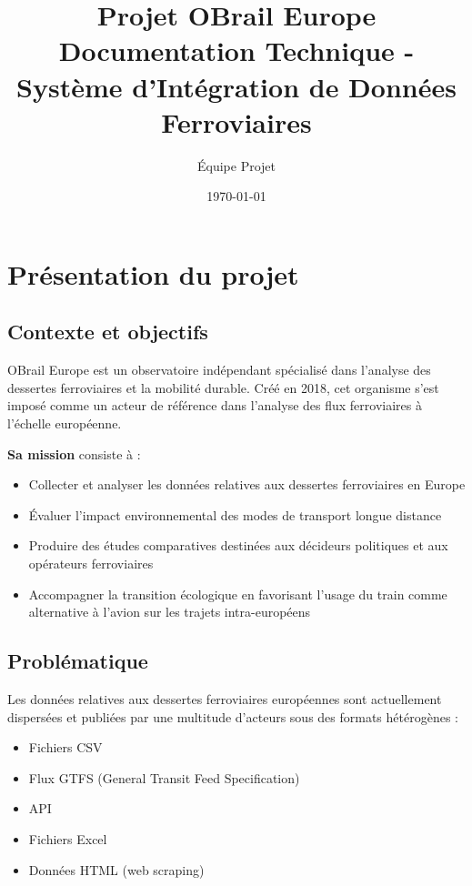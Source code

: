 \documentclass[12pt,a4paper]{article}
\title{\textbf{Projet OBrail Europe} \\
\large Documentation Technique - Système d'Intégration de Données Ferroviaires}
\author{Équipe Projet}
\date{\today}
\begin{document}
\maketitle
\tableofcontents
\newpage

\section{Présentation du projet}

\subsection{Contexte et objectifs}

OBrail Europe est un observatoire indépendant spécialisé dans l'analyse des dessertes ferroviaires et la mobilité durable. Créé en 2018, cet organisme s'est imposé comme un acteur de référence dans l'analyse des flux ferroviaires à l'échelle européenne.

\textbf{Sa mission} consiste à :
\begin{itemize}
    \item Collecter et analyser les données relatives aux dessertes ferroviaires en Europe
    \item Évaluer l'impact environnemental des modes de transport longue distance
    \item Produire des études comparatives destinées aux décideurs politiques et aux opérateurs ferroviaires
    \item Accompagner la transition écologique en favorisant l'usage du train comme alternative à l'avion sur les trajets intra-européens
\end{itemize}

\subsection{Problématique}

Les données relatives aux dessertes ferroviaires européennes sont actuellement dispersées et publiées par une multitude d'acteurs sous des formats hétérogènes :
\begin{itemize}
    \item Fichiers CSV
    \item Flux GTFS (General Transit Feed Specification)
    \item API
    \item Fichiers Excel
    \item Données HTML (web scraping)
\end{itemize}
\end{document}

